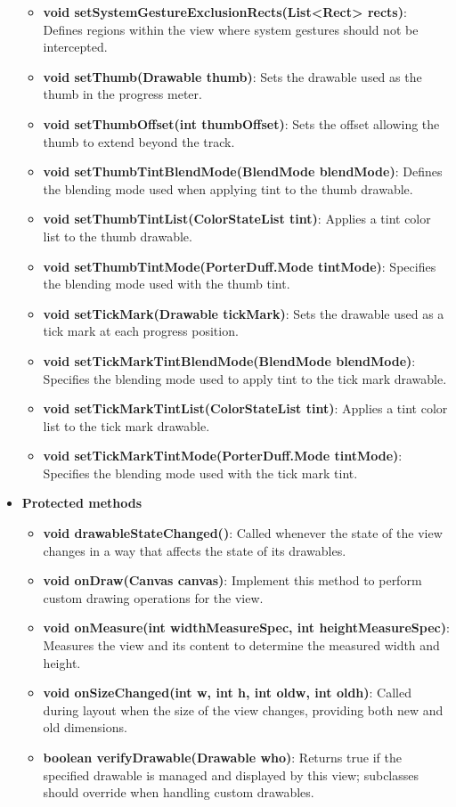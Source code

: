 \documentclass{report}
\begin{document}
\begin{itemize}
\begin{itemize}
                \item \textbf{void setSystemGestureExclusionRects(List<Rect> rects)}: Defines regions within the view where system gestures should not be intercepted.
                \item \textbf{void setThumb(Drawable thumb)}: Sets the drawable used as the thumb in the progress meter.
                \item \textbf{void setThumbOffset(int thumbOffset)}: Sets the offset allowing the thumb to extend beyond the track.
                \item \textbf{void setThumbTintBlendMode(BlendMode blendMode)}: Defines the blending mode used when applying tint to the thumb drawable.
                \item \textbf{void setThumbTintList(ColorStateList tint)}: Applies a tint color list to the thumb drawable.
                \item \textbf{void setThumbTintMode(PorterDuff.Mode tintMode)}: Specifies the blending mode used with the thumb tint.
                \item \textbf{void setTickMark(Drawable tickMark)}: Sets the drawable used as a tick mark at each progress position.
                \item \textbf{void setTickMarkTintBlendMode(BlendMode blendMode)}: Specifies the blending mode used to apply tint to the tick mark drawable.
                \item \textbf{void setTickMarkTintList(ColorStateList tint)}: Applies a tint color list to the tick mark drawable.
                \item \textbf{void setTickMarkTintMode(PorterDuff.Mode tintMode)}: Specifies the blending mode used with the tick mark tint.
            \end{itemize}
        \item \textbf{Protected methods}
            \begin{itemize}
                \item \textbf{void drawableStateChanged()}: Called whenever the state of the view changes in a way that affects the state of its drawables.
                \item \textbf{void onDraw(Canvas canvas)}: Implement this method to perform custom drawing operations for the view.
                \item \textbf{void onMeasure(int widthMeasureSpec, int heightMeasureSpec)}: Measures the view and its content to determine the measured width and height.
                \item \textbf{void onSizeChanged(int w, int h, int oldw, int oldh)}: Called during layout when the size of the view changes, providing both new and old dimensions.
                \item \textbf{boolean verifyDrawable(Drawable who)}: Returns true if the specified drawable is managed and displayed by this view; subclasses should override when handling custom drawables.
            \end{itemize}


    \end{itemize}
\end{document}
